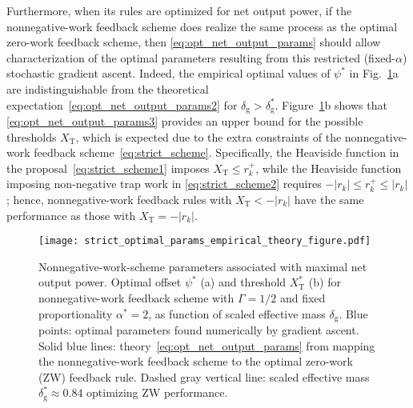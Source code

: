 \documentclass[%
reprint,
bibnotes, amsmath, amssymb, aps, pre,
 showkeys,
floatfix
]{revtex4-2}
\newcommand{\mrm}{\mathrm}
\newcommand{\dg}{\delta_{\mrm{g}}}
\newcommand{\xkr}{r_{k}}
\newcommand{\xkpr}{r_{k}^{+}}
\newcommand{\xT}{X_{\mrm{T}}}
\begin{document}
Furthermore, when its rules are optimized for net output power, if the nonnegative-work feedback scheme does realize the same process as the optimal zero-work feedback scheme, then \eqref{eq:opt_net_output_params} should allow characterization of the optimal parameters resulting from this restricted (fixed-$\alpha$) stochastic gradient ascent. 
Indeed, the empirical optimal values of $\psi^{*}$ in Fig.~\ref{fig:opt_net_output_params_strict}a are indistinguishable from the theoretical expectation~\eqref{eq:opt_net_output_params2} for $\dg > \dg^{*}$.
Figure~\ref{fig:opt_net_output_params_strict}b shows that \eqref{eq:opt_net_output_params3} provides an upper bound for the possible thresholds $\xT$, which is expected due to the extra constraints of the nonnegative-work feedback scheme~\eqref{eq:strict_scheme}.
Specifically, the Heaviside function in the proposal~\eqref{eq:strict_scheme1} imposes $\xT \le \xkpr$, while the Heaviside function imposing non-negative trap work in \eqref{eq:strict_scheme2} requires $-|\xkr| \le \xkpr \le |\xkr|$; hence, nonnegative-work feedback rules with $\xT<-|\xkr|$ have the same performance as those with $\xT = -|\xkr|$.

\begin{figure}
    \centering
    \texttt{[image: strict\_optimal\_params\_empirical\_theory\_figure.pdf]}
    \caption{
        Nonnegative-work-scheme parameters associated with maximal net output power. 
        Optimal offset $\psi^{*}$ (a) and threshold $\xT^{*}$ (b) for nonnegative-work feedback scheme with $\Gamma = 1/2$ and fixed proportionality $\alpha^{*} = 2$, as function of scaled effective mass $\dg$.  
        Blue points: optimal parameters found numerically by gradient ascent.
        Solid blue lines: theory~\eqref{eq:opt_net_output_params} from mapping the nonnegative-work feedback scheme to the optimal zero-work (ZW) feedback rule.
        Dashed gray vertical line: scaled effective mass $\dg^{*}\approx 0.84$ optimizing ZW performance.
        }
    \label{fig:opt_net_output_params_strict}
\end{figure}
\end{document}
